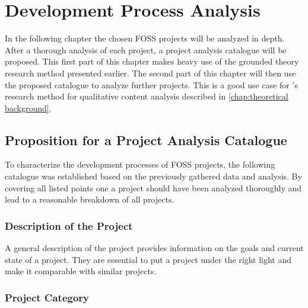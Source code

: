\chapter{Development Process Analysis} %
\label{chap:analysis}

In the following chapter the chosen \ac{FOSS} projects will be analyzed in
depth. After a thorough analysis of each project, a project analysis catalogue
will be proposed. This first part of this chapter makes heavy use of the
grounded theory research method presented earlier. The second part of this
chapter will then use the proposed catalogue to analyze further projects. This
is a good use case for \citeauthor{Mayring2000}'s research method for
qualitative content analysis described in \autoref{chap:theoretical
background}.













\section{Proposition for a Project Analysis Catalogue} %

To characterize the development processes of \ac{FOSS} projects, the following
catalogue was established based on the previously gathered data and analysis. By
covering all listed points one a project should have been analyzed thoroughly
and lead to a reasonable breakdown of all projects.

\subsection{Description of the Project}

A general description of the project provides information on the goals and
current state of a project. They are essential to put a project under the right
light and make it comparable with similar projects.

\subsection{Project Category}

